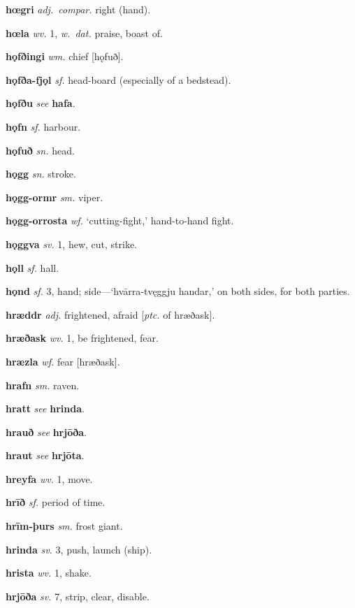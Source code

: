 \documentclass[12pt,letterpaper]{book}
\begin{document}
\noindent
\textbf{hœgri} \textit{adj.\ compar.} right (hand).

\noindent
\textbf{hœla} \textit{wv.} 1, \textit{w.\ dat.} praise, boast of.

\noindent
\textbf{hǫfðingi} \textit{wm.} chief [hǫfuð].

\noindent
\textbf{hǫfða-fjǫl} \textit{sf.} head-board (especially of a bedstead).

\noindent
\textbf{hǫfðu} \textit{} \textit{see} \textbf{hafa}.

\noindent
\textbf{hǫfn} \textit{sf.} harbour.

\noindent
\textbf{hǫfuð} \textit{sn.} head.

\noindent
\textbf{hǫgg} \textit{sn.} stroke.

\noindent
\textbf{hǫgg-ormr} \textit{sm.} viper.

\noindent
\textbf{hǫgg-orrosta} \textit{wf.} `cutting-fight,' hand-to-hand fight.

\noindent
\textbf{hǫggva} \textit{sv.} 1, hew, cut, strike.

\noindent
\textbf{hǫll} \textit{sf.} hall.

\noindent
\textbf{hǫnd} \textit{sf.} 3, hand; side---`hvārra-tvęggju handar,' on both
    sides, for both parties.

\noindent
\textbf{hræddr} \textit{adj.} frightened, afraid [\textit{ptc.} of hræðask].

\noindent
\textbf{hræðask} \textit{wv.} 1, be frightened, fear.

\noindent
\textbf{hræzla} \textit{wf.} fear [hræðask].

\noindent
\textbf{hrafn} \textit{sm.} raven.

\noindent
\textbf{hratt} \textit{} \textit{see} \textbf{hrinda}.

\noindent
\textbf{hrauð} \textit{} \textit{see} \textbf{hrjōða}.

\noindent
\textbf{hraut} \textit{} \textit{see} \textbf{hrjōta}.

\noindent
\textbf{hreyfa} \textit{wv.} 1, move.

\noindent
\textbf{hrīð} \textit{sf.} period of time.

\noindent
\textbf{hrīm-þurs} \textit{sm.} frost giant.

\noindent
\textbf{hrinda} \textit{sv.} 3, push, launch (ship).

\noindent
\textbf{hrista} \textit{wv.} 1, shake.

\noindent
\textbf{hrjōða} \textit{sv.} 7, strip, clear, disable.
\end{document}
